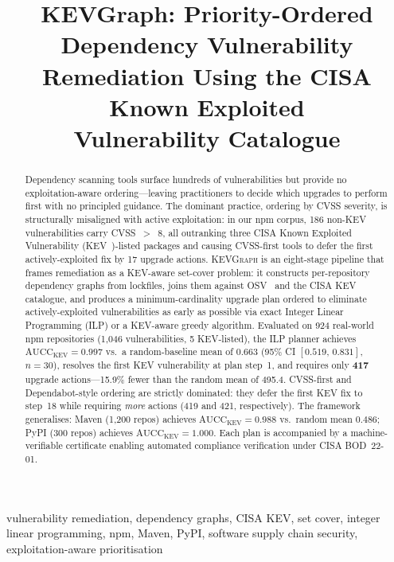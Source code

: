 \documentclass[conference]{IEEEtran}
\newcommand{\kevgraph}{\textsc{KEVGraph}\xspace}
\newcommand{\aucc}{$\mathrm{AUCC}_{\mathrm{KEV}}$\xspace}
\begin{document}
\title{KEVGraph: Priority-Ordered Dependency Vulnerability\\
Remediation Using the CISA Known Exploited\\
Vulnerability Catalogue}

\author{%
}

\maketitle

\begin{abstract}
Dependency scanning tools surface hundreds of vulnerabilities but provide
no exploitation-aware ordering---leaving practitioners to decide which
upgrades to perform first with no principled guidance.
The dominant practice, ordering by CVSS severity, is structurally
misaligned with active exploitation: in our npm corpus, 186 non-KEV
vulnerabilities carry CVSS~$>$~8, all outranking three CISA
Known Exploited Vulnerability (KEV~\cite{cisa_kev})-listed packages and
causing CVSS-first tools to defer the first actively-exploited fix by
17 upgrade actions.
\kevgraph is an eight-stage pipeline that frames remediation as a
KEV-aware set-cover problem: it constructs per-repository dependency
graphs from lockfiles, joins them against OSV~\cite{osv} and the CISA
KEV catalogue, and produces a minimum-cardinality upgrade plan ordered
to eliminate actively-exploited vulnerabilities as early as possible
via exact Integer Linear Programming (ILP) or a KEV-aware greedy
algorithm.
Evaluated on 924 real-world npm repositories (1,046 vulnerabilities,
5 KEV-listed), the ILP planner achieves \aucc $= \mathbf{0.997}$ vs.\
a random-baseline mean of $\mathbf{0.663}$ (95\% CI $[0.519,\,0.831]$,
$n=30$), resolves the first KEV vulnerability at plan step~1, and
requires only \textbf{417} upgrade actions---15.9\% fewer than the
random mean of 495.4.
CVSS-first and Dependabot-style ordering are strictly dominated:
they defer the first KEV fix to step~18 while requiring \emph{more}
actions (419 and 421, respectively).
The framework generalises: Maven (1,200 repos) achieves \aucc $= 0.988$
vs.\ random mean $0.486$; PyPI (300 repos) achieves \aucc $= 1.000$.
Each plan is accompanied by a machine-verifiable certificate enabling
automated compliance verification under CISA BOD~22-01.
\end{abstract}

\begin{IEEEkeywords}
vulnerability remediation, dependency graphs, CISA KEV, set cover,
integer linear programming, npm, Maven, PyPI, software supply chain
security, exploitation-aware prioritisation
\end{IEEEkeywords}
\end{document}
